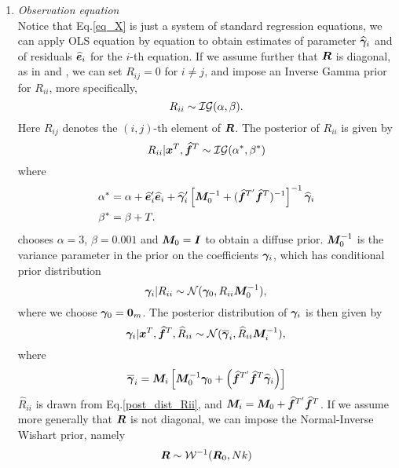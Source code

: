 \begin{enumerate}
\begin{enumerate}
\item
\textit{Observation equation}\\
Notice that Eq.\eqref{eq_X} is just a system of standard regression equations, we can apply OLS equation by equation to obtain estimates of parameter $\widehat{\bm \gamma}_i$ and of residuals $\widehat{\bm e}_i$ for the $i$-th equation. If we assume further that $\bm R$ is diagonal, as in \cite{FAVAR} and \cite{FAVAR_sign}, we can set $R_{ij}=0$ for $i\ne j$, and impose an Inverse Gamma prior for $R_{ii}$, more specifically,
\begin{equation}
	R_{ii}\sim\mathcal{I}\mathcal{G}(\alpha,\beta).
\end{equation}
Here $R_{ij}$ denotes the $(i,j)$-th element of $\bm R$. The posterior of $R_{ii}$ is given by
\begin{equation}
\label{post_dist_Rii}
	R_{ii}|\bm x^T,\widehat{\bm f}^T\sim\mathcal{I}\mathcal{G}(\alpha^*,\beta^*)
\end{equation}
where
\begin{align}
	\alpha^*&=\alpha+\widehat{\bm e}_i'\widehat{\bm e}_i+\widehat{\bm \gamma}_i'\left[\bm M_0^{-1}+(\widehat{\bm f}^{T'}\widehat{\bm f}^T)^{-1}\right]^{-1}\widehat{\bm \gamma}_i\\
	\beta^*&=\beta+T.
\end{align}
\cite{FAVAR} chooses $\alpha=3$, $\beta=0.001$ and $\bm M_0=\bm I$ to obtain a diffuse prior. $\bm M_0^{-1}$ is the variance parameter in the prior on the coefficients $\bm \gamma_i$, which has conditional prior distribution
\begin{equation}
	\bm \gamma_i|R_{ii}\sim\mathcal{N}(\bm \gamma_0,R_{ii}\bm M_0^{-1}),
\end{equation}
where we choose $\bm \gamma_0=\boldsymbol{0}_m$. The posterior distribution of $\bm \gamma_i$ is then given by
\begin{equation}
	\bm \gamma_i|\bm x^T,\widehat{\bm f}^T,\widehat R_{ii}\sim\mathcal{N}(\overline{\bm \gamma}_i,\widehat R_{ii}\bm M_i^{-1}),
\end{equation}
where 
\begin{equation}
	\overline{\bm \gamma}_i = \bm M_i\left[\bm M_0^{-1}\bm \gamma_0+\left(\widehat{\bm f}^{T'}\widehat{\bm f}^T\widehat{\bm \gamma}_i\right)\right]
\end{equation}
$\widehat R_{ii}$ 
is drawn from Eq.\eqref{post_dist_Rii}, and 
$\bm M_i=\bm M_0+\widehat{\bm f}^{T'}\widehat{\bm f}^T$. If we assume more generally that $\bm R$ is not diagonal, we can impose the Normal-Inverse Wishart prior, namely
\begin{align}
	\mR&\distr\calW^{-1}(\mR_0,Nk)\\

\end{align}
\end{enumerate}
\end{enumerate}
